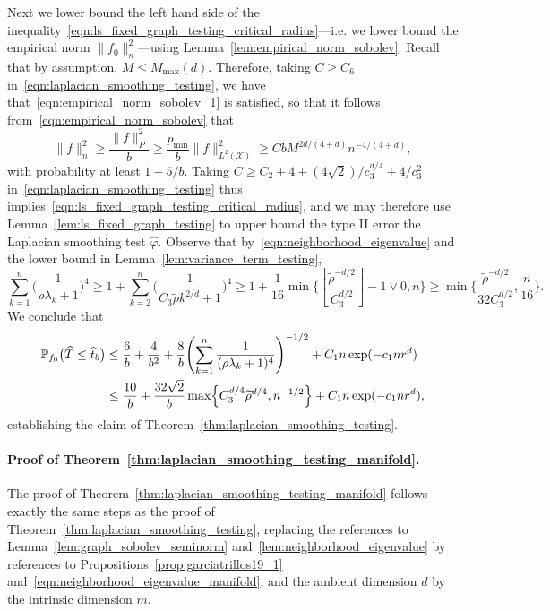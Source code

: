 \documentclass[twoside]{article}
\newcommand{\floor}[1]{\left\lfloor #1 \right\rfloor}
\newcommand{\1}{\mathbf{1}}
\newcommand{\Xset}{\mathcal{X}}
\newcommand{\Leb}{L}
\newcommand{\Pbb}{\mathbb{P}}
\newcommand{\wt}[1]{\widetilde{#1}}
\newcommand{\wh}[1]{\widehat{#1}}
\theoremstyle{definition}
\theoremstyle{remark}
\begin{document}
Next we lower bound the left hand side of the inequality~\eqref{eqn:ls_fixed_graph_testing_critical_radius}---i.e. we lower bound the empirical norm $\|f_0\|_n^2$---using Lemma~\ref{lem:empirical_norm_sobolev}. Recall that by assumption, $M \leq M_{\max}(d)$. Therefore, taking $C \geq C_6$ in~\eqref{eqn:laplacian_smoothing_testing}, we have that~\eqref{eqn:empirical_norm_sobolev_1} is satisfied, so that it follows from~\eqref{eqn:empirical_norm_sobolev} that
\begin{equation*}
\|f\|_n^2 \geq \frac{\|f\|_{P}^2}{b} \geq \frac{p_{\min}}{b} \|f\|_{\Leb^2(\Xset)}^2 \geq CbM^{2d/(4 + d)}n^{-4/(4 + d)},
\end{equation*}
with probability at least $1 - 5/b$. Taking $C \geq C_2 + 4 + (4\sqrt{2})/c_3^{d/4} + 4/c_3^2$ in~\eqref{eqn:laplacian_smoothing_testing} thus implies~\eqref{eqn:ls_fixed_graph_testing_critical_radius}, and we may therefore use Lemma~\ref{lem:ls_fixed_graph_testing} to upper bound the type II error the Laplacian smoothing test $\wh{\varphi}$. Observe that by~\eqref{eqn:neighborhood_eigenvalue} and the lower bound in Lemma~\ref{lem:variance_term_testing}, 
\begin{equation*}
\sum_{k = 1}^{n} \biggl(\frac{1}{\rho \lambda_k + 1}\biggr)^4 \geq 1 + \sum_{k = 2}^{n}\biggl(\frac{1}{C_3\wt{\rho}k^{2/d} + 1}\biggr)^4 \geq 1 + \frac{1}{16}\min\biggl\{\floor{\frac{\wt{\rho}^{-d/2}}{C_3^{d/2}}} - 1 \vee 0, n \biggr\} \geq \min\biggl\{\frac{\wt{\rho}^{-d/2}}{32 C_3^{d/2}}, \frac{n}{16} \biggr\}.
\end{equation*}
We conclude that
\begin{align*}
\Pbb_{f_0}\bigl(\wh{T} \leq \wh{t}_b\bigr) & \leq \frac{6}{b} + \frac{4}{b^2} + \frac{8}{b} \Biggl(\sum_{k = 1}^{n} \frac{1}{(\rho\lambda_k + 1)^4} \Biggr)^{-1/2} + C_1n\exp(-c_1nr^d)\\
& \leq \frac{10}{b} + \frac{32\sqrt{2}}{b} \max\Bigl\{ C_3^{d/4}\wt{\rho}^{d/4} ,n^{-1/2}\Bigr\} + C_1n\exp(-c_1nr^d),
\end{align*}
establishing the claim of Theorem~\ref{thm:laplacian_smoothing_testing}.

\paragraph{Proof of Theorem~\ref{thm:laplacian_smoothing_testing_manifold}.}
The proof of Theorem~\ref{thm:laplacian_smoothing_testing_manifold} follows exactly the same steps as the proof of Theorem~\ref{thm:laplacian_smoothing_testing}, replacing the references to Lemma~\ref{lem:graph_sobolev_seminorm} and~\ref{lem:neighborhood_eigenvalue} by references to Propositions~\ref{prop:garciatrillos19_1} and~\eqref{eqn:neighborhood_eigenvalue_manifold}, and the ambient dimension $d$ by the intrinsic dimension $m$.
\end{document}
